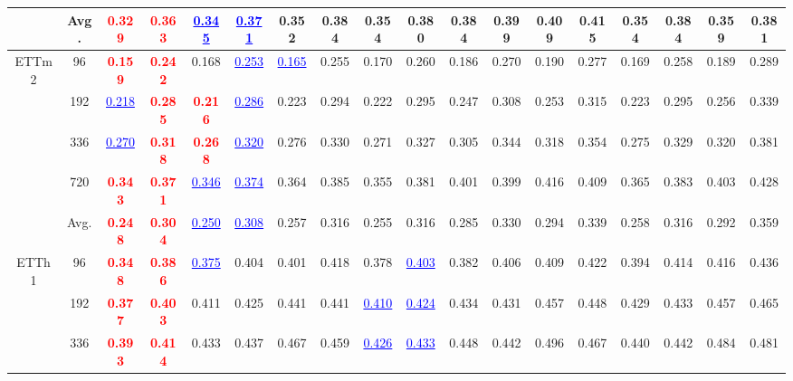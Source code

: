 \documentclass[final,3p,times]{elsarticle}
\begin{document}
\begin{table}[H]
{\begin{tabular}{cc|cc|cc|cc|cc|cc|cc|cc|cc}
\cmidrule(lr){2-18}
 & Avg. & \textcolor{red}{\textbf{0.329}} & \textcolor{red}{\textbf{0.363}} & \textcolor{blue}{\underline{0.345}} & \textcolor{blue}{\underline{0.371}} & 0.352 & 0.384 & 0.354 & 0.380 & 0.384 & 0.399 & 0.409 & 0.415 & 0.354 & 0.384 & 0.359 & 0.381 \\
\midrule
\multirow{5}{*}{ETTm2} & 96 & \textcolor{red}{\textbf{0.159}} & \textcolor{red}{\textbf{0.242}} & 0.168 & \textcolor{blue}{\underline{0.253}} & \textcolor{blue}{\underline{0.165}} & 0.255 & 0.170 & 0.260 & 0.186 & 0.270 & 0.190 & 0.277 & 0.169 & 0.258 & 0.189 & 0.289 \\
 & 192 & \textcolor{blue}{\underline{0.218}} & \textcolor{red}{\textbf{0.285}} & \textcolor{red}{\textbf{0.216}} & \textcolor{blue}{\underline{0.286}} & 0.223 & 0.294 & 0.222 & 0.295 & 0.247 & 0.308 & 0.253 & 0.315 & 0.223 & 0.295 & 0.256 & 0.339 \\
 & 336 & \textcolor{blue}{\underline{0.270}} & \textcolor{red}{\textbf{0.318}} & \textcolor{red}{\textbf{0.268}} & \textcolor{blue}{\underline{0.320}} & 0.276 & 0.330 & 0.271 & 0.327 & 0.305 & 0.344 & 0.318 & 0.354 & 0.275 & 0.329 & 0.320 & 0.381 \\
 & 720 & \textcolor{red}{\textbf{0.343}} & \textcolor{red}{\textbf{0.371}} & \textcolor{blue}{\underline{0.346}} & \textcolor{blue}{\underline{0.374}} & 0.364 & 0.385 & 0.355 & 0.381 & 0.401 & 0.399 & 0.416 & 0.409 & 0.365 & 0.383 & 0.403 & 0.428 \\
\cmidrule(lr){2-18}
 & Avg. & \textcolor{red}{\textbf{0.248}} & \textcolor{red}{\textbf{0.304}} & \textcolor{blue}{\underline{0.250}} & \textcolor{blue}{\underline{0.308}} & 0.257 & 0.316 & 0.255 & 0.316 & 0.285 & 0.330 & 0.294 & 0.339 & 0.258 & 0.316 & 0.292 & 0.359 \\
\midrule
\multirow{5}{*}{ETTh1} & 96 & \textcolor{red}{\textbf{0.348}} & \textcolor{red}{\textbf{0.386}} & \textcolor{blue}{\underline{0.375}} & 0.404 & 0.401 & 0.418 & 0.378 & \textcolor{blue}{\underline{0.403}} & 0.382 & 0.406 & 0.409 & 0.422 & 0.394 & 0.414 & 0.416 & 0.436 \\
 & 192 & \textcolor{red}{\textbf{0.377}} & \textcolor{red}{\textbf{0.403}} & 0.411 & 0.425 & 0.441 & 0.441 & \textcolor{blue}{\underline{0.410}} & \textcolor{blue}{\underline{0.424}} & 0.434 & 0.431 & 0.457 & 0.448 & 0.429 & 0.433 & 0.457 & 0.465 \\
 & 336 & \textcolor{red}{\textbf{0.393}} & \textcolor{red}{\textbf{0.414}} & 0.433 & 0.437 & 0.467 & 0.459 & \textcolor{blue}{\underline{0.426}} & \textcolor{blue}{\underline{0.433}} & 0.448 & 0.442 & 0.496 & 0.467 & 0.440 & 0.442 & 0.484 & 0.481 \\

\end{tabular}}
\end{table}
\end{document}
